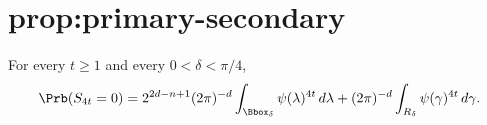 \chapter{prop:primary-secondary}\label{chap:prop_primary_secondary}
\begin{proposition}\label{prop:primary-secondary}
\leanok
For every $t\ge 1$ and every $0<\delta<\pi/4$,
\[
  \Prb(S_{4t}=0)
  =
  2^{2d-n+1}(2\pi)^{-d}\int_{\Bbox_\delta}\psi(\lambda)^{4t}\,d\lambda
  +(2\pi)^{-d}\int_{R_\delta}\psi(\gamma)^{4t}\,d\gamma.
\]
\end{proposition}
